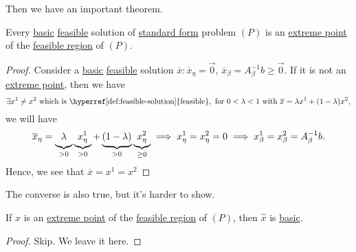Then we have an important theorem.
\begin{theorem}\label{thm:lec5-1}
	Every \hyperref[def:basic-solution]{basic} \hyperref[def:feasible-solution]{feasible} solution of \hyperref[def:standard-form]{standard form} problem \((P)\) is an
	\hyperref[def:extreme-point]{extreme point} of the \hyperref[def:feasible-region]{feasible region} of \((P)\).
\end{theorem}
\begin{proof}
	Consider a \hyperref[def:basic-solution]{basic} \hyperref[def:feasible-solution]{feasible} solution \(\overline{x}\colon \overline{x}_{\eta} = \vec{0}\),
	\(\overline{x}_{\beta} = A^{-1}_{\beta}b\geq \vec{0}\). If it is not an \hyperref[def:extreme-point]{extreme point}, then we have
	\[
		\exists x^1\neq x^2 \text{ which is \hyperref[def:feasible-solution]{feasible}}, \text{ for }0<\lambda<1\text{ with }\overline{x} = \lambda x^1 + (1-\lambda)x^2,
	\]
	we will have
	\[
		\overline{x}_{\eta} = \underbrace{\vphantom{x^1_{\eta}}\lambda}_{>0}\underbrace{x^1_{\eta}}_{>0} + \underbrace{\vphantom{x^1_{\eta}}(1-\lambda)}_{>0}\underbrace{x^2_{\eta}}_{\geq 0} \implies x^1_{\eta} = x^2_{\eta} = 0 \implies x^1_{\beta} = x^2_{\beta} = A^{-1}_{\beta}b.
	\]
	Hence, we see that \(\overline{x} = x^1 = x^2\)\conta
\end{proof}

The converse is also true, but it's harder to show.
\begin{theorem}\label{thm:lec5-2}
	If \(\hat{x}\) is an \hyperref[def:extreme-point]{extreme point} of the \hyperref[def:feasible-region]{feasible region} of \((P)\), then \(\hat{x}\) is
	\hyperref[def:basic-solution]{basic}.
\end{theorem}
\begin{proof}
	Skip. We leave it here.
\end{proof}

